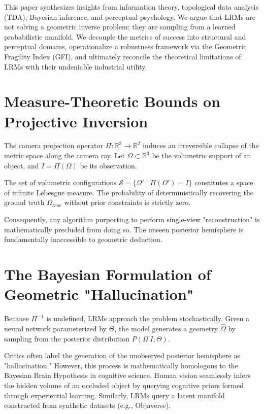 \documentclass[10pt,journal,compsoc]{IEEEtran}
\begin{document}
This paper synthesizes insights from information theory, topological data analysis (TDA), Bayesian inference, and perceptual psychology. We argue that LRMs are not solving a geometric inverse problem; they are sampling from a learned probabilistic manifold. We decouple the metrics of success into structural and perceptual domains, operationalize a robustness framework via the Geometric Fragility Index (GFI), and ultimately reconcile the theoretical limitations of LRMs with their undeniable industrial utility.

\section{Measure-Theoretic Bounds on Projective Inversion}
The camera projection operator $\Pi: \mathbb{R}^3 \to \mathbb{R}^2$ induces an irreversible collapse of the metric space along the camera ray. Let $\Omega \subset \mathbb{R}^3$ be the volumetric support of an object, and $I = \Pi(\Omega)$ be its observation.

\begin{theorem}
The set of volumetric configurations $\mathcal{S} = \{\Omega' \mid \Pi(\Omega') = I\}$ constitutes a space of infinite Lebesgue measure. The probability of deterministically recovering the ground truth $\Omega_{true}$ without prior constraints is strictly zero.
\end{theorem}

Consequently, any algorithm purporting to perform single-view "reconstruction" is mathematically precluded from doing so. The unseen posterior hemisphere is fundamentally inaccessible to geometric deduction.

\section{The Bayesian Formulation of Geometric "Hallucination"}
Because $\Pi^{-1}$ is undefined, LRMs approach the problem stochastically. Given a neural network parameterized by $\Theta$, the model generates a geometry $\hat{\Omega}$ by sampling from the posterior distribution $P(\Omega | I, \Theta)$.

Critics often label the generation of the unobserved posterior hemisphere as "hallucination." However, this process is mathematically homologous to the Bayesian Brain Hypothesis in cognitive science. Human vision seamlessly infers the hidden volume of an occluded object by querying cognitive priors formed through experiential learning. Similarly, LRMs query a latent manifold constructed from synthetic datasets (e.g., Objaverse). 
\end{document}
